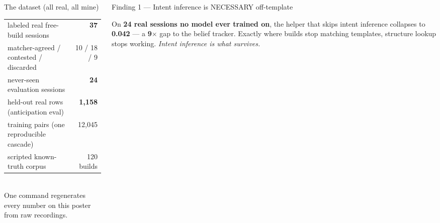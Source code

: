 \documentclass[final]{beamer}
\begin{document}
\begin{frame}[t]
\begin{columns}[t]
\begin{column}{0.31\textwidth}
\begin{block}{The dataset (all real, all mine)}
\centering
\begin{tabular}{lr}
\toprule
labeled real free-build sessions & \textbf{37} \\
\quad matcher-agreed / contested / discarded & 10 / 18 / 9 \\
never-seen evaluation sessions & \textbf{24} \\
held-out real rows (anticipation eval) & \textbf{1{,}158} \\
training pairs (one reproducible cascade) & 12{,}045 \\
scripted known-truth corpus & 120 builds \\
\bottomrule
\end{tabular}\\[0.4em]
\small One command regenerates every number on this poster from raw recordings.
\end{block}

\end{column}

\begin{column}{0.36\textwidth}

\begin{exampleblock}{Finding 1 --- Intent inference is NECESSARY off-template}
\begin{center}
\end{center}
On \textbf{24 real sessions no model ever trained on}, the helper that skips
intent inference collapses to \textbf{0.042} --- a \textbf{9$\times$} gap to
the belief tracker. Exactly where builds stop matching templates, structure
lookup stops working. \textit{Intent inference is what survives.}
\end{exampleblock}


\end{column}
\end{columns}
\end{frame}
\end{document}
